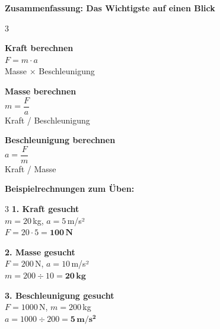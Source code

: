 \documentclass[11pt, a4paper]{article}
\begin{document}
\begin{merksatzbox}
\begin{center}
\textbf{Zusammenfassung: Das Wichtigste auf einen Blick}
\end{center}

\begin{multicols}{3}
\begin{center}
\textbf{Kraft berechnen}\\[0.3em]
$F = m \cdot a$\\[0.2em]
\small Masse $\times$ Beschleunigung
\end{center}

\columnbreak

\begin{center}
\textbf{Masse berechnen}\\[0.3em]
$m = \dfrac{F}{a}$\\[0.2em]
\small Kraft / Beschleunigung
\end{center}

\columnbreak

\begin{center}
\textbf{Beschleunigung berechnen}\\[0.3em]
$a = \dfrac{F}{m}$\\[0.2em]
\small Kraft / Masse
\end{center}
\end{multicols}
\end{merksatzbox}


\vspace{0.3em}

\begin{beispielbox}
\textbf{Beispielrechnungen zum Üben:}

\begin{multicols}{3}
\textbf{1. Kraft gesucht}\\
$m = 20\,$kg, $a = 5\,$m/s²\\
$F = 20 \cdot 5 = \mathbf{100\,N}$

\columnbreak

\textbf{2. Masse gesucht}\\
$F = 200\,$N, $a = 10\,$m/s²\\
$m = 200 \div 10 = \mathbf{20\,kg}$

\columnbreak

\textbf{3. Beschleunigung gesucht}\\
$F = 1000\,$N, $m = 200\,$kg\\
$a = 1000 \div 200 = \mathbf{5\,m/s^2}$
\end{multicols}
\end{beispielbox}
\end{document}

